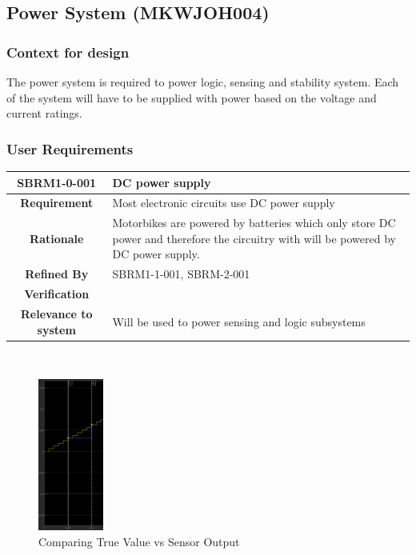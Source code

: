 \documentclass{article}
\begin{document}
\subsection{Power System (MKWJOH004)}
\label{sec:PowerSystem}
    \subsubsection{Context for design}
    The power system is required to power logic, sensing and stability system. Each of the system will have to be supplied with power based on the voltage and current ratings.
     \subsubsection{User Requirements}
\begin{tabular}{|c|p{7.2cm}|}
 \hline
 \textbf{SBRM1-0-001} &\textbf{DC power supply}  \\ 
 \hline
 \textbf{Requirement} & Most electronic circuits use DC power supply\\
 \hline
 \textbf{Rationale} & Motorbikes are powered by batteries which only store DC power and therefore the circuitry with will be powered by DC power supply. \\
 \hline
 \textbf{Refined By} & SBRM1-1-001, SBRM-2-001\\%
 \hline
 \textbf{Verification} & \\
 \hline
 \textbf{Relevance to system} & Will be used to power sensing and logic subsystems\\
 \hline
\end{tabular}\\[0.5cm]


\begin{figure}[ht]
        \centering
        \includegraphics[height = 50mm]{pic/acc_zoom.PNG}
        \caption{Comparing True Value vs Sensor Output}
\end{figure}
\end{document}
